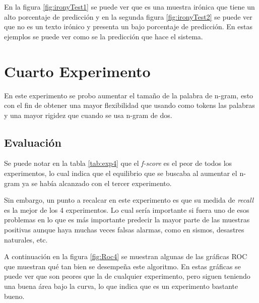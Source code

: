 \par En la figura \ref{fig:ironyTest1} se puede ver que es una muestra irónica que tiene un alto porcentaje de predicción y en la segunda figura \ref{fig:ironyTest2} se puede ver que no es un texto irónico y presenta un bajo porcentaje de predicción. En estas ejemplos se puede ver como se la predicción que hace el sistema.

\section{Cuarto Experimento}

\par En este experimento se probo aumentar el tamaño de la palabra de n-gram, esto con el fin de obtener una mayor flexibilidad que usando como tokens las palabras y una mayor rigidez que cuando se usa n-gram de dos.

\subsection{Evaluación}

\begin{center}
	
\end{center}

\par Se puede notar en la tabla \ref{tab:exp4} que el \textit{f-score} es el peor de todos los experimentos, lo cual indica que el equilibrio que se buscaba al aumentar el n-gram ya se había alcanzado con el tercer experimento.

\par Sin embargo, un punto a recalcar en este experimento es que su medida de \textit{recall} es la mejor de los 4 experimentos. Lo cual sería importante si fuera uno de esos problemas en lo que es más importante predecir la mayor parte de las muestras positivas aunque haya muchas veces falsas alarmas, como en sismos, desastres naturales, etc.

\par A continuación en la figura \ref{fig:Roc4}  se muestran algunas de las gráficas ROC que muestran qué tan bien se desempeña este algoritmo. En estas gráficas se puede ver que son peores que la de cualquier experimento, pero siguen teniendo una buena área bajo la curva, lo que indica que es un experimento bastante bueno.

